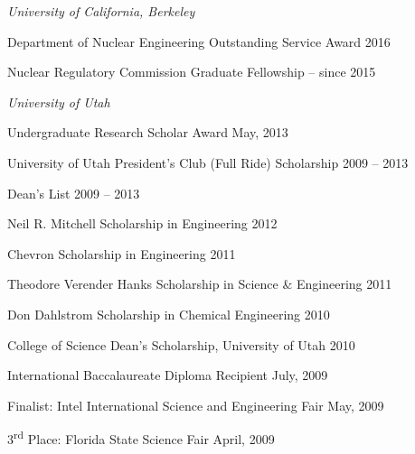 
\begin{list1}
\item[] \textit{University of California, Berkeley}
\begin{list2}
\item Department of Nuclear Engineering Outstanding Service Award \hfill{2016}
\item Nuclear Regulatory Commission Graduate Fellowship \hfill{-- since 2015}
\end{list2}
\item[] \textit{University of Utah}
\begin{list2}
\item  Undergraduate Research Scholar Award \hfill{May, 2013}
\item University of Utah President's Club (Full Ride) Scholarship \hfill{2009 -- 2013}
\item Dean's List \hfill{2009 -- 2013}
\item Neil R. Mitchell Scholarship in Engineering \hfill{2012}
\item Chevron Scholarship in Engineering \hfill{2011}
\item Theodore Verender Hanks Scholarship in Science \& Engineering \hfill{2011}
\item Don Dahlstrom Scholarship in Chemical Engineering \hfill{2010}
\item College of Science Dean's Scholarship, University of Utah \hfill{2010}
\end{list2}
\item[] International Baccalaureate Diploma Recipient  \hfill{July, 2009}
\item[] Finalist: Intel International Science and Engineering Fair  \hfill{ May, 2009}
\item[] 3\textsuperscript{rd} Place: Florida State Science Fair  \hfill{April, 2009}
\end{list1}

